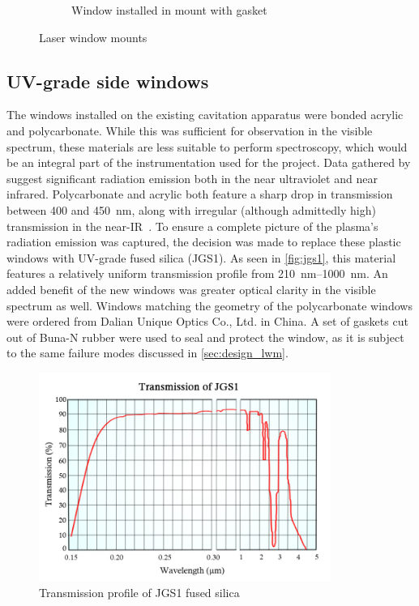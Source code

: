 \begin{figure}[h]
\begin{subfigure}[t]{0.48\textwidth}
                    \caption{Window installed in mount with gasket}
                    \label{fig:windowMount_installed}
                \end{subfigure}
                \caption{Laser window mounts}
                \label{fig:windowMount}
            \end{figure}

        \subsection{UV-grade side windows}
            The windows installed on the existing cavitation apparatus were bonded acrylic and polycarbonate. While this was sufficient for observation in the visible spectrum, these materials are less suitable to perform spectroscopy, which would be an integral part of the instrumentation used for the project. Data gathered by \textcite{zimakovInteractionNearIRLaser2016,luCharacteristicDiagnosticsLaserStabilized2022} suggest significant radiation emission both in the near ultraviolet and near infrared. Polycarbonate and acrylic both feature a sharp drop in transmission between 400 and 450~\unit{nm}, along with irregular (although admittedly high) transmission in the near-IR~\cite{gsplasticopticsTransmissionCurvesOptics}. To ensure a complete picture of the plasma's radiation emission was captured, the decision was made to replace these plastic windows with UV-grade fused silica (JGS1). As seen in \autoref{fig:jgs1}, this material features a relatively uniform transmission profile from \qtyrange{210}{1000}{nm}. An added benefit of the new windows was greater optical clarity in the visible spectrum as well. Windows matching the geometry of the polycarbonate windows were ordered from Dalian Unique Optics Co., Ltd. in China. A set of gaskets cut out of Buna-N rubber were used to seal and protect the window, as it is subject to the same failure modes discussed in \autoref{sec:design_lwm}.

            \begin{figure}[h]
                \centering
                \includegraphics[width=0.85\textwidth, clip, trim=0 0 0 15pt]{assets/3 design/jgs1_transmission.jpg}
                \caption[Transmission profile of JGS1 fused silica]{Transmission profile of JGS1 fused silica~\cite{shalomeoJGS1}}
                \label{fig:jgs1}
            \end{figure}


